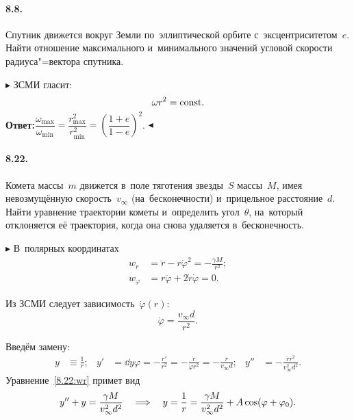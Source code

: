 \documentclass{weekly}
\begin{document}

\paragraph{8.8.} Спутник движется вокруг Земли по~эллиптической орбите
с~эксцентриситетом~$e$. Найти отношение максимального и~минимального
значений угловой скорости радиуса"=вектора спутника.

$\blacktriangleright$ ЗСМИ гласит:
\begin{equation}
    \omega r^2 = \mathrm{const}.
\end{equation}
\textbf{Ответ:}\qquad $\dfrac{\omega_{\max}}{\omega_{\min}} =
\dfrac{r_{\max}^2}{r_{\min}^2} = \left(\dfrac{1+e}{1-e}\right)^2$.
\hfill $\blacktriangleleft$


\paragraph{8.22.} Комета массы~$m$ движется в~поле тяготения звезды~$S$
массы~$M$, имея невозмущённую скорость~$v_\infty$ (на~бесконечности)
и~прицельное расстояние~$d$. Найти уравнение траектории кометы
и~определить угол~$\theta$, на~который отклоняется её траектория,
когда она снова удаляется в~бесконечность.

$\blacktriangleright$
В~полярных координатах
\begin{align}
    w_r &= \ddot r - r\dot\varphi^2 = -\frac{\gamma M}{r^2};
        \label{8.22:wr} \\
    w_\varphi &= r\ddot\varphi + 2\dot r \dot\varphi = 0.
\end{align}

Из ЗСМИ следует зависимость~$\dot\varphi(r)$:
\begin{equation}
    \dot\varphi = \frac{v_\infty d}{r^2}.
\end{equation}

Введём замену:
\begin{align}
    y &\equiv \frac{1}{r}; &
    y' &= \dd{y}{\varphi} = -\frac{r'}{r^2}
        = -\frac{\dot r}{\dot\varphi r^2} = -\frac{\dot r}{v_\infty d}; &
    y'' &= -\frac{\ddot r r^2}{v_\infty^2 d^2}.
\end{align}
Уравнение~\eqref{8.22:wr} примет вид
\begin{equation}
    y'' + y = \frac{\gamma M}{v_\infty^2 d^2} \quad \Longrightarrow \quad
    y = \frac{1}{r} = \frac{\gamma M}{v_\infty^2 d^2} +
        A \cos(\varphi + \varphi_0).
\end{equation}
\end{document}
